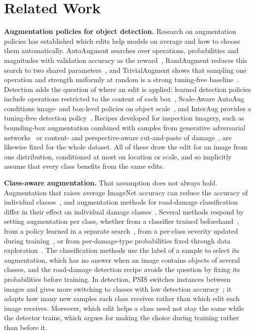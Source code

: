\documentclass[conference]{IEEEtran}
\begin{document}
\section{Related Work}
\label{sec:related}

\noindent\textbf{Augmentation policies for object detection.} Research on augmentation policies has established which edits help models on average and how to choose them automatically. AutoAugment searches over operations, probabilities and magnitudes with validation accuracy as the reward~\cite{cubuk2019auto}, RandAugment reduces this search to two shared parameters~\cite{cubuk2020rand}, and TrivialAugment shows that sampling one operation and strength uniformly at random is a strong tuning-free baseline~\cite{muller2021trivial}. Detection adds the question of where an edit is applied: learned detection policies include operations restricted to the content of each box~\cite{zoph2020det}, Scale-Aware AutoAug conditions image- and box-level policies on object scale~\cite{chen2021scale}, and InterAug provides a tuning-free detection policy~\cite{thopalli2023interaug}. Recipes developed for inspection imagery, such as bounding-box augmentation combined with samples from generative adversarial networks~\cite{aghayan2024} or content- and perspective-aware cut-and-paste of damage~\cite{rdd_cutpaste}, are likewise fixed for the whole dataset. All of these draw the edit for an image from one distribution, conditioned at most on location or scale, and so implicitly assume that every class benefits from the same edits.

\noindent\textbf{Class-aware augmentation.} That assumption does not always hold. Augmentation that raises average ImageNet accuracy can reduce the accuracy of individual classes~\cite{kirichenko2023}, and augmentation methods for road-damage classification differ in their effect on individual damage classes~\cite{tsuchiya2019}. Several methods respond by setting augmentation per class, whether from a classifier trained beforehand~\cite{yoo2023}, from a policy learned in a separate search~\cite{cheung2022adaaug}, from a per-class severity updated during training~\cite{ahn2023cuda}, or from per-damage-type probabilities fixed through data exploration~\cite{rdd_detectron2}. The classification methods use the label of a sample to select its augmentation, which has no answer when an image contains objects of several classes, and the road-damage detection recipe avoids the question by fixing its probabilities before training. In detection, PSIS switches instances between images and gives more switching to classes with low detection accuracy~\cite{wang2019psis}; it adapts how many new samples each class receives rather than which edit each image receives. Moreover, which edit helps a class need not stay the same while the detector trains, which argues for making the choice during training rather than before it.
\end{document}
